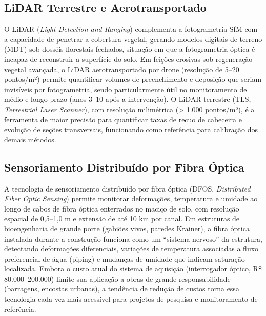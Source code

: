 \documentclass[
  portuguese,
  11pt,
  a4paper,
  open=any]{scrbook}
\begin{document}
\subsection{LiDAR Terrestre e
Aerotransportado}\label{lidar-terrestre-e-aerotransportado}

O LiDAR (\emph{Light Detection and Ranging}) complementa a fotogrametria
SfM com a capacidade de penetrar a cobertura vegetal, gerando modelos
digitais de terreno (MDT) sob dosséis florestais fechados, situação em
que a fotogrametria óptica é incapaz de reconstruir a superfície do
solo. Em feições erosivas sob regeneração vegetal avançada, o LiDAR
aerotransportado por drone (resolução de 5--20 pontos/m²) permite
quantificar volumes de preenchimento e deposição que seriam invisíveis
por fotogrametria, sendo particularmente útil no monitoramento de médio
e longo prazo (anos 3--10 após a intervenção). O LiDAR terrestre (TLS,
\emph{Terrestrial Laser Scanner}), com resolução milimétrica
(\textgreater{} 1.000 pontos/m²), é a ferramenta de maior precisão para
quantificar taxas de recuo de cabeceira e evolução de seções
transversais, funcionando como referência para calibração dos demais
métodos.

\subsection{Sensoriamento Distribuído por Fibra
Óptica}\label{sensoriamento-distribuuxeddo-por-fibra-uxf3ptica}

A tecnologia de sensoriamento distribuído por fibra óptica (DFOS,
\emph{Distributed Fiber Optic Sensing}) permite monitorar deformações,
temperatura e umidade ao longo de cabos de fibra óptica enterrados no
maciço de solo, com resolução espacial de 0,5--1,0 m e extensão de até
10 km por canal. Em estruturas de bioengenharia de grande porte (gabiões
vivos, paredes Krainer), a fibra óptica instalada durante a construção
funciona como um ``sistema nervoso'' da estrutura, detectando
deformações diferenciais, variações de temperatura associadas a fluxo
preferencial de água (piping) e mudanças de umidade que indicam
saturação localizada. Embora o custo atual do sistema de aquisição
(interrogador óptico, R\$ 80.000--200.000) limite sua aplicação a obras
de grande responsabilidade (barragens, encostas urbanas), a tendência de
redução de custos torna essa tecnologia cada vez mais acessível para
projetos de pesquisa e monitoramento de referência.
\end{document}
